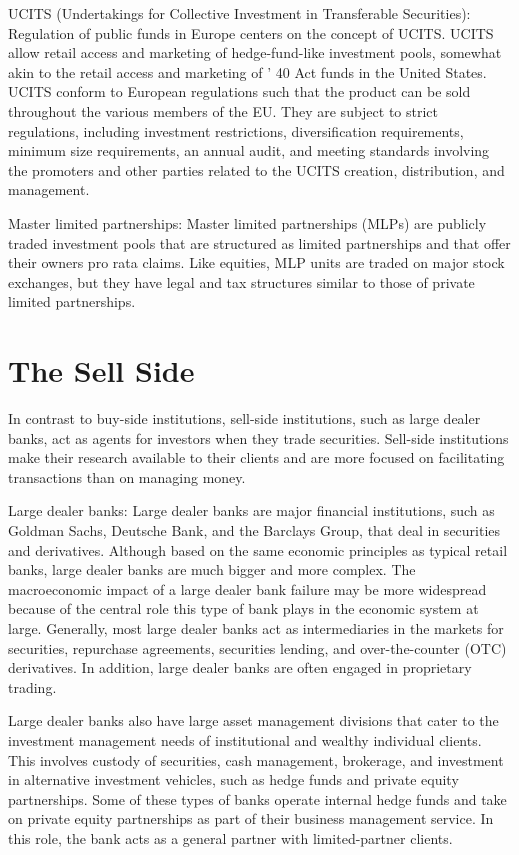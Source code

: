 \documentclass[11pt]{article}
\begin{document}
UCITS (Undertakings for Collective Investment in Transferable Securities): Regulation of public funds in Europe centers on the concept of UCITS. UCITS allow retail access and marketing of hedge-fund-like investment pools, somewhat akin to the retail access and marketing of ' 40 Act funds in the United States. UCITS conform to European regulations such that the product can be sold throughout the various members of the EU. They are subject to strict regulations, including investment restrictions, diversification requirements, minimum size requirements, an annual audit, and meeting standards involving the promoters and other parties related to the UCITS creation, distribution, and management.

Master limited partnerships: Master limited partnerships (MLPs) are publicly traded investment pools that are structured as limited partnerships and that offer their owners pro rata claims. Like equities, MLP units are traded on major stock exchanges, but they have legal and tax structures similar to those of private limited partnerships.

\section*{The Sell Side}
In contrast to buy-side institutions, sell-side institutions, such as large dealer banks, act as agents for investors when they trade securities. Sell-side institutions make their research available to their clients and are more focused on facilitating transactions than on managing money.

Large dealer banks: Large dealer banks are major financial institutions, such as Goldman Sachs, Deutsche Bank, and the Barclays Group, that deal in securities and derivatives. Although based on the same economic principles as typical retail banks, large dealer banks are much bigger and more complex. The macroeconomic impact of a large dealer bank failure may be more widespread because of the central role this type of bank plays in the economic system at large. Generally, most large dealer banks act as intermediaries in the markets for securities, repurchase agreements, securities lending, and over-the-counter (OTC) derivatives. In addition, large dealer banks are often engaged in proprietary trading.

Large dealer banks also have large asset management divisions that cater to the investment management needs of institutional and wealthy individual clients. This involves custody of securities, cash management, brokerage, and investment in alternative investment vehicles, such as hedge funds and private equity partnerships. Some of these types of banks operate internal hedge funds and take on private equity partnerships as part of their business management service. In this role, the bank acts as a general partner with limited-partner clients.
\end{document}

